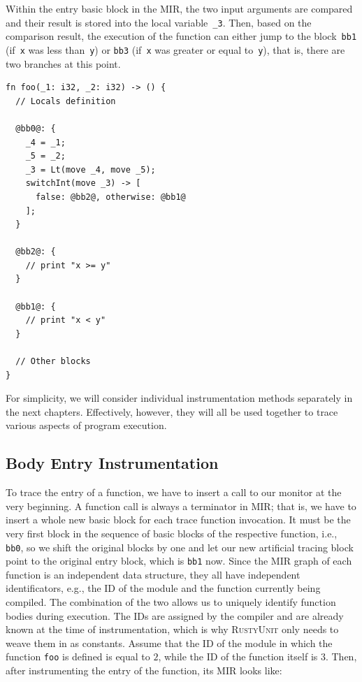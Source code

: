 \documentclass[paper=a4,%
  twoside,%
  BCOR4mm,%
  abstract=true,%
  toc=bibliography,%
  chapterprefix=true,%
  toc=bibliographynumbered,%
  open=right,%
  english,%
  pagesize=pdftex]{scrreprt}
\newcommand{\tech}{\textsc{RustyUnit}\xspace}
\newcommand{\mir}{\ac{MIR}\xspace}
\begin{document}
Within the entry basic block in the \mir, the two input arguments are compared and their result is stored into the local variable~\texttt{\string_3}. Then, based on the comparison result, the execution of the function can either jump to the block~\texttt{bb1} (if~\texttt{x} was less than~\texttt{y}) or \texttt{bb3} (if~\texttt{x} was greater or equal to~\texttt{y}), that is, there are two branches at this point.
\begin{lstlisting}[language={MIR}, style=boxed, caption={MIR of the \texttt{foo} function}, label=lst:mir-of-example-function-to-instrument]
fn foo(_1: i32, _2: i32) -> () {
  // Locals definition

  @bb0@: {
    _4 = _1;
    _5 = _2;
    _3 = Lt(move _4, move _5);
    switchInt(move _3) -> [
      false: @bb2@, otherwise: @bb1@
    ];
  }

  @bb2@: {
    // print "x >= y"
  }

  @bb1@: {
    // print "x < y"
  }

  // Other blocks
}
\end{lstlisting}

For simplicity, we will consider individual instrumentation methods separately in the next chapters. Effectively, however, they will all be used together to trace various aspects of program execution.

\subsection{Body Entry Instrumentation}
To trace the entry of a function, we have to insert a call to our monitor at the very beginning. A function call is always a terminator in \mir; that is, we have to insert a whole new basic block for each trace function invocation. It must be the very first block in the sequence of basic blocks of the respective function, i.e., \texttt{bb0}, so we shift the original blocks by one and let our new artificial tracing block point to the original entry block, which is \texttt{bb1} now. Since the \mir graph of each function is an independent data structure, they all have independent identificators, e.g., the ID of the module and the function currently being compiled. The combination of the two allows us to uniquely identify function bodies during execution. The IDs are assigned by the compiler and are already known at the time of instrumentation, which is why \tech only needs to weave them in as constants. Assume that the ID of the module in which the function \texttt{foo} is defined is equal to $2$, while the ID of the function itself is $3$. Then, after instrumenting the entry of the function, its \mir looks like:
\end{document}
